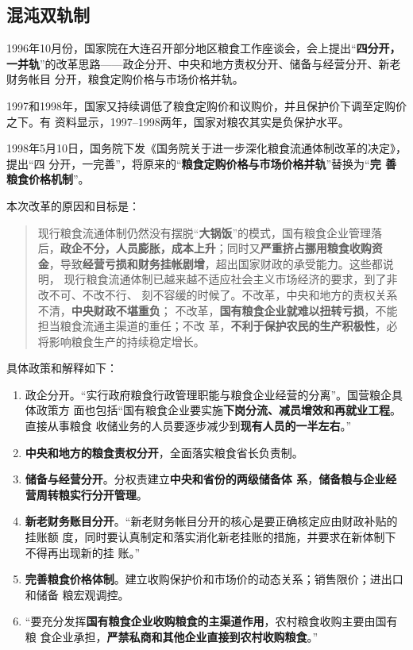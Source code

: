 
\subsection{混沌双轨制}

1996年10月份，国家院在大连召开部分地区粮食工作座谈会，会上提出“\textbf{四分开，
  一并轨}”的改革思路——政企分开、中央和地方责权分开、储备与经营分开、新老财务帐目
分开，粮食定购价格与市场价格并轨。

1997和1998年，国家又持续调低了粮食定购价和议购价，并且保护价下调至定购价之下。有
资料显示，1997--1998两年，国家对粮农其实是负保护水平。

1998年5月10日，国务院下发《国务院关于进一步深化粮食流通体制改革的决定》，提出“四
分开，一完善”，将原来的“\textbf{粮食定购价格与市场价格并轨}”替换为“\textbf{完
  善粮食价格机制}”。

本次改革的原因和目标是：
\begin{quotation}
  现行粮食流通体制仍然没有摆脱“\textbf{大锅饭}”的模式，国有粮食企业管理落
  后，\textbf{政企不分，人员膨胀，成本上升}；同时又\textbf{严重挤占挪用粮食收购资
    金}，导致\textbf{经营亏损和财务挂帐剧增}，超出国家财政的承受能力。这些都说明，
  现行粮食流通体制已越来越不适应社会主义市场经济的要求，到了非改不可、不改不行、
  刻不容缓的时候了。不改革，中央和地方的责权关系不清，\textbf{中央财政不堪重负}；
  不改革，\textbf{国有粮食企业就难以扭转亏损}，不能担当粮食流通主渠道的重任；不改
  革，\textbf{不利于保护农民的生产积极性}，必将影响粮食生产的持续稳定增长。
\end{quotation}

具体政策和解释如下：
\begin{enumerate}
\item 政企分开。“实行政府粮食行政管理职能与粮食企业经营的分离”。国营粮企具体政策方
  面也包括“国有粮食企业要实施\textbf{下岗分流、减员增效和再就业工程}。直接从事粮食
  收储业务的人员要逐步减少到\textbf{现有人员的一半左右}。”

\item \textbf{中央和地方的粮食责权分开}，全面落实粮食省长负责制。

\item \textbf{储备与经营分开}。分权责建立\textbf{中央和省份的两级储备体
    系}，\textbf{储备粮与企业经营周转粮实行分开管理}。

\item \textbf{新老财务账目分开}。“新老财务帐目分开的核心是要正确核定应由财政补贴的挂账额
  度，同时要认真制定和落实消化新老挂账的措施，并要求在新体制下不得再出现新的挂
  账。”\cite{caobaoming01}

\item \textbf{完善粮食价格体制}。建立收购保护价和市场价的动态关系；销售限价；进出口和储备
  粮宏观调控。

\item “要充分发挥\textbf{国有粮食企业收购粮食的主渠道作用}，农村粮食收购主要由国有粮
  食企业承担，\textbf{严禁私商和其他企业直接到农村收购粮食}。”
\end{enumerate}

